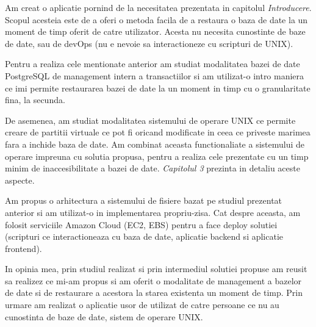 Am creat o aplicatie pornind de la necesitatea prezentata in capitolul \textit{Introducere}. Scopul acesteia este de a oferi o metoda facila de a restaura o baza de date la un moment de timp oferit de catre utilizator. Acesta nu necesita cunostinte de baze de date, sau de devOps (nu e nevoie sa interactioneze cu scripturi de UNIX).
\par
Pentru a realiza cele mentionate anterior am studiat modalitatea bazei de date PostgreSQL de management intern a transactiilor si am utilizat-o intro maniera ce imi permite restaurarea bazei de date la un moment in timp cu o granularitate fina, la secunda.
\par
De asemenea, am studiat modalitatea sistemului de operare UNIX ce permite creare de partitii virtuale ce pot fi oricand modificate in ceea ce priveste marimea fara a inchide baza de date. Am combinat aceasta functionaliate a sistemului de operare impreuna cu solutia propusa, pentru a realiza cele prezentate cu un timp minim de inaccesibilitate a bazei de date. \textit{Capitolul 3} prezinta in detaliu aceste aspecte.
\par
Am propus o arhitectura a sistemului de fisiere bazat pe studiul prezentat anterior si am utilizat-o in implementarea propriu-zisa. Cat despre aceasta, am folosit serviciile Amazon Cloud (EC2, EBS) pentru a face deploy solutiei (scripturi ce interactioneaza cu baza de date, aplicatie backend si aplicatie frontend).
\par
In opinia mea, prin studiul realizat si prin intermediul solutiei propuse am reusit sa realizez ce mi-am propus si am oferit o modalitate de management a bazelor de date si de restaurare a acestora la starea existenta un moment de timp. Prin urmare am realizat o aplicatie usor de utilizat de catre persoane ce nu au cunostinta de baze de date, sistem de operare UNIX.